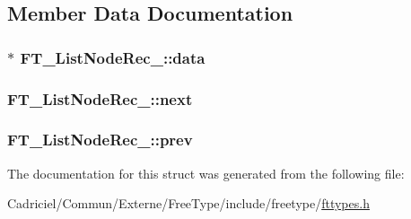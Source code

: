 \subsection{Member Data Documentation}
\hypertarget{struct_f_t___list_node_rec___ab0202be88f722442a4bec9aeb5f6418f}{
\subsubsection[{data}]{$\ast$ F\-T\-\_\-\-List\-Node\-Rec\-\_\-\-::data}}\label{struct_f_t___list_node_rec___ab0202be88f722442a4bec9aeb5f6418f}
\hypertarget{struct_f_t___list_node_rec___a8275962fa8c92b77435cb4fa76251f39}{
\subsubsection[{next}]{ F\-T\-\_\-\-List\-Node\-Rec\-\_\-\-::next}}\label{struct_f_t___list_node_rec___a8275962fa8c92b77435cb4fa76251f39}
\hypertarget{struct_f_t___list_node_rec___a41c77950e6940b1b98e04709b705c046}{
\subsubsection[{prev}]{ F\-T\-\_\-\-List\-Node\-Rec\-\_\-\-::prev}}\label{struct_f_t___list_node_rec___a41c77950e6940b1b98e04709b705c046}


The documentation for this struct was generated from the following file\-:\begin{DoxyCompactItemize}
\item 
Cadriciel/\-Commun/\-Externe/\-Free\-Type/include/freetype/\hyperlink{fttypes_8h}{fttypes.\-h}\end{DoxyCompactItemize}
